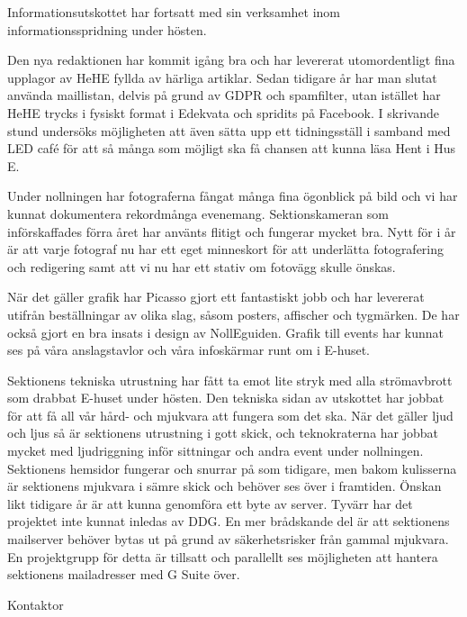 \documentclass[../_main/handlingar.tex]{subfiles}
\begin{document}
\vspace{8px}
Informationsutskottet har fortsatt med sin verksamhet inom informationsspridning under hösten. 

Den nya redaktionen har kommit igång bra och har levererat utomordentligt fina upplagor av HeHE fyllda av härliga artiklar. Sedan tidigare år har man slutat använda maillistan, delvis på grund av GDPR och spamfilter, utan istället har HeHE trycks i fysiskt format i Edekvata och spridits på Facebook. I skrivande stund undersöks möjligheten att även sätta upp ett tidningsställ i samband med LED café för att så många som möjligt ska få chansen att kunna läsa Hent i Hus E. 

Under nollningen har fotograferna fångat många fina ögonblick på bild och vi har kunnat dokumentera rekordmånga evenemang. Sektionskameran som införskaffades förra året har använts flitigt och fungerar mycket bra. Nytt för i år är att varje fotograf nu har ett eget minneskort för att underlätta fotografering och redigering samt att vi nu har ett stativ om fotovägg skulle önskas.   

När det gäller grafik har Picasso gjort ett fantastiskt jobb och har levererat utifrån beställningar av olika slag, såsom posters, affischer och tygmärken. De har också gjort en bra insats i design av NollEguiden. Grafik till events har kunnat ses på våra anslagstavlor och våra infoskärmar runt om i E-huset. 

Sektionens tekniska utrustning har fått ta emot lite stryk med alla strömavbrott som drabbat E-huset under hösten. Den tekniska sidan av utskottet har jobbat för att få all vår hård- och mjukvara att fungera som det ska. När det gäller ljud och ljus så är sektionens utrustning i gott skick, och teknokraterna har jobbat mycket med ljudriggning inför sittningar och andra event under nollningen. Sektionens hemsidor fungerar och snurrar på som tidigare, men bakom kulisserna är sektionens mjukvara i sämre skick och behöver ses över i framtiden. Önskan likt tidigare år är att kunna genomföra ett byte av server. Tyvärr har det projektet inte kunnat inledas av DDG. En mer brådskande del är att sektionens mailserver behöver bytas ut på grund av säkerhetsrisker från gammal mjukvara. En projektgrupp för detta är tillsatt och parallellt ses möjligheten att hantera sektionens mailadresser med G Suite över. 



\begin{signatures}{1}
    \mvh
    \signature{Mattias Lundström}{Kontaktor}
\end{signatures}
\end{document}
